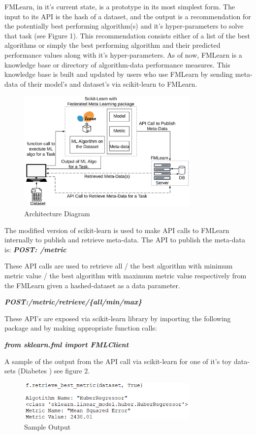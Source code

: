 \documentclass{article}
\begin{document}
FMLearn, in it’s current state, is a prototype in its most simplest form. The input to its API is the hash of a dataset, and the output is a recommendation for the potentially best performing algorithm(s) and it's hyper-parameters to solve that task (see Figure 1). This recommendation consists either of a list of the best algorithms or simply the best performing algorithm and their predicted performance values along with it's hyper-parameters. As of now, FMLearn is a knowledge base or directory of algorithm-data performance measures. This knowledge base is built and updated by users who use FMLearn by sending meta-data of their model’s and dataset’s via scikit-learn to FMLearn.

\begin{figure}[ht]
    \centering
    \includegraphics[width=3.5in]{architecture-diagram.jpeg}
    \caption{Architecture Diagram}
    \label{architecture-diagram}
\end{figure}

The modified version of scikit-learn is used to make API calls to FMLearn internally to publish and retrieve meta-data. The API to publish the meta-data is: 
\textbf{\textit{POST: /metric}}

These API calls are used to retrieve all / the best algorithm with minimum metric value / the best algorithm with maximum metric value respectively from the FMLearn given a hashed-dataset as a data parameter. 

\textbf{\textit{POST:/metric/retrieve/\{all/min/max\}}}

These API’s are exposed via scikit-learn library by importing the following package and by making appropriate function calls:

\textbf{\textit{from sklearn.fml import FMLClient}}

A sample of the output from the API call via scikit-learn for one of it's toy data-sets (Diabetes \cite{bradley-et-al}) see figure 2.
\begin{figure}[ht]
    \centering
    \includegraphics[width=3.5in]{sample-output.PNG}
    \caption{Sample Output}
    \label{sample-output}
\end{figure}
\end{document}
